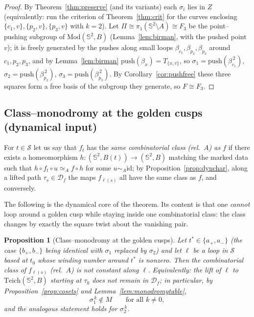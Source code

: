 \documentclass[11pt]{amsart}
\theoremstyle{plain}
\newtheorem{proposition}[theorem]{Proposition}
\theoremstyle{definition}
\newcommand{\Sph}{\mathbb{S}^2}
\newcommand{\Teich}{\mathrm{Teich}}
\newcommand{\Mod}{\mathrm{Mod}}
\newcommand{\D}{\mathcal{D}}
\newcommand{\S}{\mathcal{S}}
\newcommand{\id}{\mathrm{id}}
\begin{document}
\begin{proof}
By Theorem~\ref{thm:preserve} (and its variants) each $\sigma_i$ lies in
$Z$ (equivalently: run the criterion of Theorem~\ref{thm:crit} for the
curves enclosing $\{c_1,v\},\{p_2,v\},\{p_3,v\}$ with $k=2$).  Let
$\Pi\cong\pi_1(\Sph\setminus A)\cong F_3$ be the point--pushing subgroup
of $\Mod(\Sph,B)$ (Lemma~\ref{lem:birman}, with the pushed point $v$); it
is freely generated by the pushes along small loops
$\beta_{c_1},\beta_{p_2},\beta_{p_3}$ around $c_1,p_2,p_3$, and by
Lemma~\ref{lem:birman} $\mathrm{push}(\beta_x)=T_{\{x,v\}}$, so
$\sigma_1=\mathrm{push}(\beta_{c_1}^{\,2})$,
$\sigma_2=\mathrm{push}(\beta_{p_2}^{\,2})$,
$\sigma_3=\mathrm{push}(\beta_{p_3}^{\,2})$.  By
Corollary~\ref{cor:pushfree} these three squares form a free basis of the
subgroup they generate, so $F\cong F_3$.
\end{proof}

\subsection{Class--monodromy at the golden cusps (dynamical input)}

For $t\in\S$ let us say that $f_t$ has the \emph{same combinatorial class
(rel.\ $A$) as $f$} if there exists a homeomorphism $h:(\Sph,B(t))\to
(\Sph,B)$ matching the marked data such that $h\circ f_t\circ
u\simeq_A f\circ h$ for some $u\sim_A\id$; by
Proposition~\ref{prop:dynchar}, along a lifted path
$\tau_s\in\D_f$ the maps $f_{\ell(s)}$ all have the same class as $f$,
and conversely.

The following is the dynamical core of the theorem.  Its content is that
one \emph{cannot} loop around a golden cusp while staying inside one
combinatorial class: the class changes by exactly the square twist
about the vanishing pair.

\begin{proposition}[Class--monodromy at the golden cusps]
\label{prop:input}
Let $t^{*}\in\{a_+,a_-\}$ (the case $\{b_+,b_-\}$ being identical with
$\sigma_1$ replaced by $\sigma_2$) and let $\ell$ be a loop in $\S$ based
at $t_0$ whose winding number around $t^{*}$ is nonzero.  Then the
combinatorial class of $f_{\ell(s)}$ (rel.\ $A$) is \emph{not} constant
along $\ell$.  Equivalently: the lift of $\ell$ to $\Teich(\Sph,B)$
starting at $\tau_0$ does not remain in $\D_f$; in particular, by
Proposition~\ref{prop:cosets} and Lemma~\ref{lem:monodromytable},
\begin{equation}\label{eq:nosigma}
\sigma_1^{\,k}\notin M\qquad\text{for all }k\ne0,
\end{equation}
and the analogous statement holds for $\sigma_2^{\,k}$.
\end{proposition}
\end{document}
